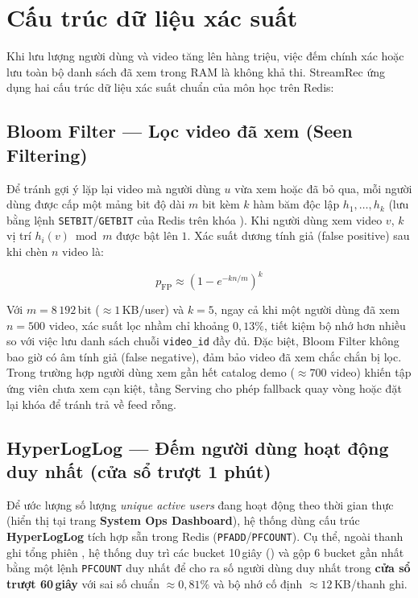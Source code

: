 \section{Cấu trúc dữ liệu xác suất}

Khi lưu lượng người dùng và video tăng lên hàng triệu, việc đếm chính xác hoặc lưu toàn bộ danh sách đã xem trong RAM là không khả thi. StreamRec ứng dụng hai cấu trúc dữ liệu xác suất chuẩn của môn học trên Redis:

\subsection{Bloom Filter --- Lọc video đã xem (Seen Filtering)}

Để tránh gợi ý lặp lại video mà người dùng $u$ vừa xem hoặc đã bỏ qua, mỗi người dùng được cấp một mảng bit độ dài $m$ bit kèm $k$ hàm băm độc lập $h_1, \dots, h_k$ (lưu bằng lệnh \texttt{SETBIT}\slash\texttt{GETBIT} của Redis trên khóa ). Khi người dùng xem video $v$, $k$ vị trí $h_i(v) \bmod m$ được bật lên $1$. Xác suất dương tính giả (false positive) sau khi chèn $n$ video là:

\begin{equation}
  p_{\mathrm{FP}} \approx \left(1 - e^{-kn/m}\right)^k
\end{equation}

Với $m = 8\,192$\,bit ($\approx 1$\,KB/user) và $k = 5$, ngay cả khi một người dùng đã xem $n = 500$ video, xác suất lọc nhầm chỉ khoảng $0{,}13\%$, tiết kiệm bộ nhớ hơn nhiều so với việc lưu danh sách chuỗi \texttt{video\_id} đầy đủ. Đặc biệt, Bloom Filter không bao giờ có âm tính giả (false negative), đảm bảo video đã xem chắc chắn bị lọc. Trong trường hợp người dùng xem gần hết catalog demo ($\approx 700$ video) khiến tập ứng viên chưa xem cạn kiệt, tầng Serving cho phép fallback quay vòng hoặc đặt lại khóa  để tránh trả về feed rỗng.

\subsection{HyperLogLog --- Đếm người dùng hoạt động duy nhất (cửa sổ trượt 1 phút)}

Để ước lượng số lượng \emph{unique active users} đang hoạt động theo thời gian thực (hiển thị tại trang \textbf{System Ops Dashboard}), hệ thống dùng cấu trúc \textbf{HyperLogLog} tích hợp sẵn trong Redis (\texttt{PFADD}\slash\texttt{PFCOUNT}). Cụ thể, ngoài thanh ghi tổng phiên , hệ thống duy trì các bucket 10\,giây () và gộp 6 bucket gần nhất bằng một lệnh \texttt{PFCOUNT} duy nhất để cho ra số người dùng duy nhất trong \textbf{cửa sổ trượt 60\,giây} với sai số chuẩn $\approx 0{,}81\%$ và bộ nhớ cố định $\approx 12$\,KB/thanh ghi.

